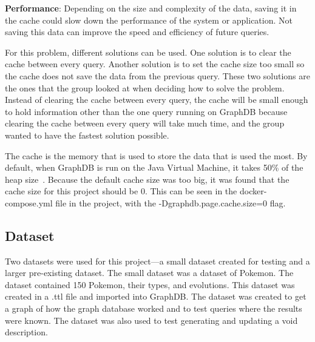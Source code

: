 \textbf{Performance}: Depending on the size and complexity of the data, saving it in the cache could slow down the performance of the system or application. Not saving this data can improve the speed and efficiency of future queries.

For this problem, different solutions can be used. One solution is to clear the cache between every query. Another solution is to set the cache size too small so the cache does not save the data from the previous query. These two solutions are the ones that the group looked at when deciding how to solve the problem. Instead of clearing the cache between every query, the cache will be small enough to hold information other than the one query running on GraphDB because clearing the cache between every query will take much time, and the group wanted to have the fastest solution possible.

The cache is the memory that is used to store the data that is used the most. By default, when GraphDB is run on the Java Virtual Machine, it takes 50\% of the heap size~\cite{cache-strategy}.
Because the default cache size was too big, it was found that the cache size for this project should be 0. This can be seen in the docker-compose.yml file in the project, with the -Dgraphdb.page.cache.size=0 flag.


\subsection{Dataset}\label{sec:dataset}
Two datasets were used for this project—a small dataset created for testing and a larger pre-existing dataset. The small dataset was a dataset of Pokemon. The dataset contained 150 Pokemon, their types, and evolutions. This dataset was created in a .ttl file and imported into GraphDB. The dataset was created to get a graph of how the graph database worked and to test queries where the results were known. The dataset was also used to test generating and updating a \gls{void} description.


